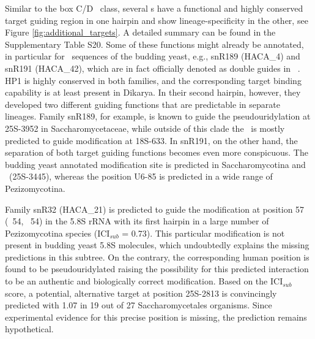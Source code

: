 Similar to the box C/D \sno\ class, several \haca s have a functional and
highly conserved target guiding region in one hairpin and show
lineage-specificity in the other, see Figure \ref{fig:additional_targets}.
A detailed summary can be found in the Supplementary Table S20. Some of
these functions might already be annotated, in particular for \sno\
sequences of the budding yeast, e.g., snR189 (HACA\_4) and snR191
(HACA\_42), which are in fact officially denoted as double guides in \sce\
\cite{Badis:2003, Schattner:2004}.  HP1 is highly conserved in both
families, and the corresponding target binding capability is at least
present in Dikarya. In their second hairpin, however, they developed two
different guiding functions that are predictable in separate
lineages. Family snR189, for example, is known to guide the
pseudouridylation at 25S-3952 in Saccharomycetaceae, while outside of this
clade the \sno\ is mostly predicted to guide modification at 18S-633. In
snR191, on the other hand, the separation of both target guiding functions
becomes even more conspicuous. The budding yeast annotated modification
site is predicted in Saccharomycotina and \Tde\ (25S-3445), whereas the
position U6-85 is predicted in a wide range of Pezizomycotina.

Family snR32 (HACA\_21) is predicted to guide the modification at position
57 (\ncr\ 54, \sce\ 54) in the 5.8S rRNA with its first hairpin in a large
number of Pezizomycotina species (ICI$_{sub}$ = 0.73). This particular
modification is not present in budding yeast 5.8S molecules, which
undoubtedly explains the missing predictions in this subtree. On the
contrary, the corresponding human position is found to be pseudouridylated
raising the possibility for this predicted interaction to be an authentic
and biologically correct modification.  Based on the ICI$_{sub}$ score, a
potential, alternative target at position 25S-2813 is convincingly
predicted with 1.07 in 19 out of 27 Saccharomycetales organisms. Since
experimental evidence for this precise position is missing, the prediction
remains hypothetical.

